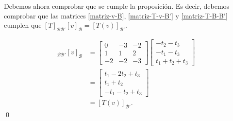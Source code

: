 \documentclass[handout]{beamer} %
\newcommand{\cB}{\mathcal{B}}
\begin{document}
    \begin{frame}

        Debemos ahora comprobar que se cumple la proposición. Es decir, debemos comprobar que las matrices \eqref{matriz-v-B}, \eqref{matriz-T-v-B'} y \eqref{matriz-T-B-B'} cumplen que $[T]_{\cB\cB'}[v]_{\cB} = [T(v)]_{\cB'}$.

        \begin{align*}
            [T]_{\cB\cB'}[v]_{\cB} &= 
            \begin{bmatrix} 0&-3&-2\\ 1&1&2\\ -2&-2&-3\end{bmatrix} \begin{bmatrix}-t_2-t_3 \\-t_1-t_3\\ t_1+t_2+t_3\end{bmatrix} \\
            &=   \begin{bmatrix}	t_1-2t_2+t_3 \\ t_1+t_2\\ -t_1-t_2+t_3\end{bmatrix}\\
            &= [T(v)]_{\cB'}.
        \end{align*}
        \qed
    \end{frame}


    
    
\end{document}
